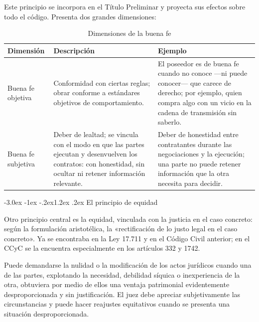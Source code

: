 \documentclass[12pt,oneside]{book}
\makeatletter
\renewcommand\section{\@startsection{section}{1}{\z@}%
  {-3.0ex \@plus -1ex \@minus -.2ex}{1.2ex \@plus .2ex}%
  {\normalfont\large\bfseries\color{acento}}}
\makeatother
\begin{document}
Este principio se incorpora en el Título Preliminar y proyecta sus efectos sobre todo el código. Presenta dos grandes dimensiones:

\begin{table}[H]
\centering
\begin{tabularx}{\textwidth}{B{0.17\textwidth} Y Y}
\toprule
\textbf{Dimensión} & \textbf{Descripción} & \textbf{Ejemplo} \\
\midrule
Buena fe objetiva & Conformidad con ciertas reglas; obrar conforme a estándares objetivos de comportamiento. & El poseedor es de buena fe cuando no conoce ---ni puede conocer--- que carece de derecho; por ejemplo, quien compra algo con un vicio en la cadena de transmisión sin saberlo. \\
Buena fe subjetiva & Deber de lealtad; se vincula con el modo en que las partes ejecutan y desenvuelven los contratos: con honestidad, sin ocultar ni retener información relevante. & Deber de honestidad entre contratantes durante las negociaciones y la ejecución; una parte no puede retener información que la otra necesita para decidir. \\
\bottomrule
\end{tabularx}
\caption{Dimensiones de la buena fe}
\end{table}

\section{El principio de equidad}

Otro principio central es la equidad, vinculada con la justicia en el caso concreto: según la formulación aristotélica, la «rectificación de lo justo legal en el caso concreto». Ya se encontraba en la Ley 17.711 y en el Código Civil anterior; en el CCyC se la encuentra especialmente en los artículos 332 y 1742.

\begin{regla}
Puede demandarse la nulidad o la modificación de los actos jurídicos cuando una de las partes, explotando la necesidad, debilidad síquica o inexperiencia de la otra, obtuviera por medio de ellos una ventaja patrimonial evidentemente desproporcionada y sin justificación. El juez debe apreciar subjetivamente las circunstancias y puede hacer reajustes equitativos cuando se presenta una situación desproporcionada.
\end{regla}
\end{document}
